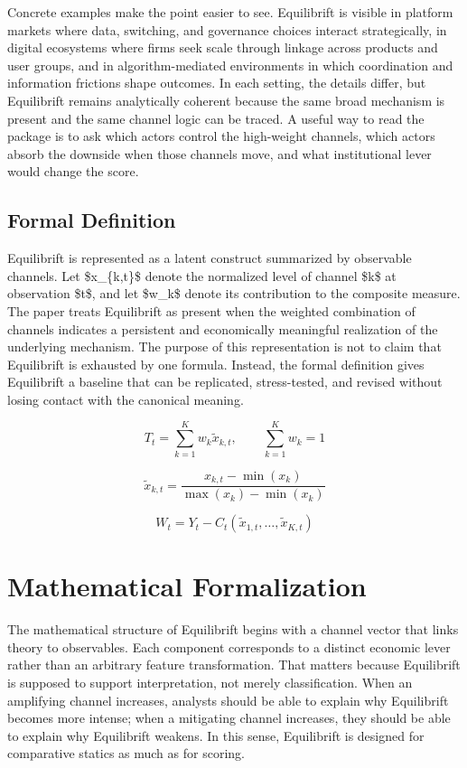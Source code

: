 \documentclass[12pt]{article}
\begin{document}
Concrete examples make the point easier to see. Equilibrift is visible in platform markets where data, switching, and governance choices interact strategically, in digital ecosystems where firms seek scale through linkage across products and user groups, and in algorithm-mediated environments in which coordination and information frictions shape outcomes. In each setting, the details differ, but Equilibrift remains analytically coherent because the same broad mechanism is present and the same channel logic can be traced. A useful way to read the package is to ask which actors control the high-weight channels, which actors absorb the downside when those channels move, and what institutional lever would change the score.

\subsection{Formal Definition}
Equilibrift is represented as a latent construct summarized by observable channels. Let \$x\_\{k,t\}\$ denote the normalized level of channel \$k\$ at observation \$t\$, and let \$w\_k\$ denote its contribution to the composite measure. The paper treats Equilibrift as present when the weighted combination of channels indicates a persistent and economically meaningful realization of the underlying mechanism. The purpose of this representation is not to claim that Equilibrift is exhausted by one formula. Instead, the formal definition gives Equilibrift a baseline that can be replicated, stress-tested, and revised without losing contact with the canonical meaning.

\begin{equation}
T_t = \sum_{k=1}^K w_k \tilde{x}_{k,t}, \qquad \sum_{k=1}^K w_k = 1
\label{eq:index}
\end{equation}

\begin{equation}
\tilde{x}_{k,t} = \frac{x_{k,t} - \min(x_k)}{\max(x_k) - \min(x_k)}
\label{eq:norm}
\end{equation}

\begin{equation}
W_t = Y_t - C_t(\tilde{x}_{1,t}, \dots, \tilde{x}_{K,t})
\label{eq:welfare}
\end{equation}

\section{Mathematical Formalization}
The mathematical structure of Equilibrift begins with a channel vector that links theory to observables. Each component corresponds to a distinct economic lever rather than an arbitrary feature transformation. That matters because Equilibrift is supposed to support interpretation, not merely classification. When an amplifying channel increases, analysts should be able to explain why Equilibrift becomes more intense; when a mitigating channel increases, they should be able to explain why Equilibrift weakens. In this sense, Equilibrift is designed for comparative statics as much as for scoring.
\end{document}
